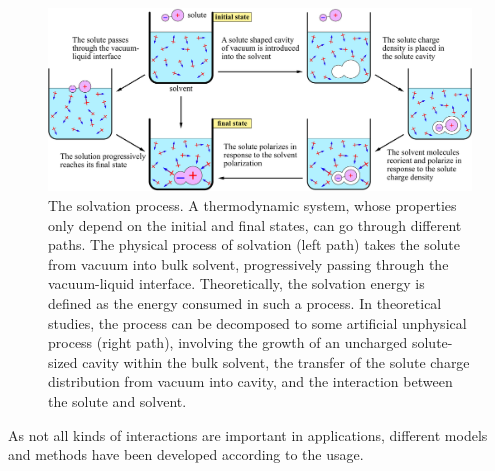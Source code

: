 \begin{figure}[h]
\centering{}\textcolor{red}{}%
\noindent\begin{minipage}[t]{1\textwidth}%
\begin{center}
\includegraphics[width=1\columnwidth]{_figure/solvation}\caption[The solvation process]{The solvation process.\label{fig:Process-of-solvation} A thermodynamic
system, whose properties only depend on the initial and final states,
can go through different paths. The physical process of solvation
(left path) takes the solute from vacuum into bulk solvent, progressively
passing through the vacuum-liquid interface. Theoretically, the solvation
energy is defined as the energy consumed in such a process. In theoretical
studies, the process can be decomposed to some artificial unphysical
process (right path), involving the growth of an uncharged solute-sized
cavity within the bulk solvent, the transfer of the solute charge
distribution from vacuum into cavity, and the interaction between
the solute and solvent.}
\par\end{center}%
\end{minipage}
\end{figure}

As not all kinds of interactions are important in applications, different
models and methods have been developed according to the usage.

